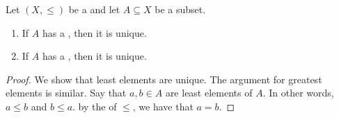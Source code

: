 \begin{lemma} \label{lemma:maximum_minimum_element_of_a_subset_of_a_poset_is_unique_if_exists}
Let $(X, \leq)$ be a  and let $A \subseteq X$ be a subset. 
\begin{enumerate}
    \item If $A$ has a , then it is unique.
    \item If $A$ has a , then it is unique.
\end{enumerate}
\end{lemma}
\begin{proof}
    We show that least elements are unique. The argument for greatest elements is similar. Say that $a,b \in A$ are least elements of $A$. In other words, $a \leq b$ and $b \leq a$. by the  of $\leq$, we have that $a = b$.
\end{proof}